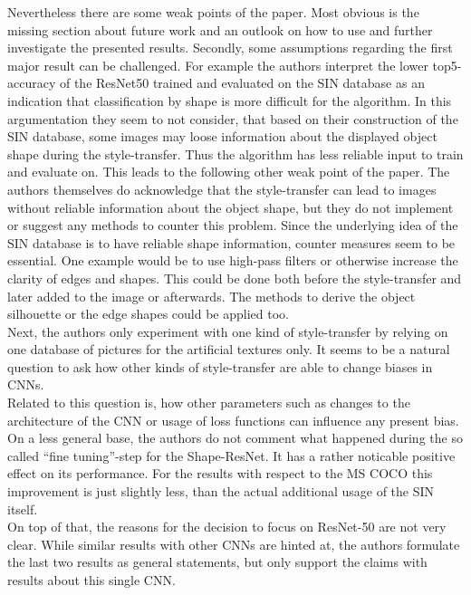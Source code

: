 \documentclass[runningheads,a4paper]{llncs}
\begin{document}
Nevertheless there are some weak points of the paper. Most obvious is the missing section about future work and an outlook on how to use and further investigate the presented results.
Secondly, some assumptions regarding the first major result can be challenged. For example the authors interpret the lower top5-accuracy of the ResNet50 trained and evaluated on the SIN database as an indication that classification by shape is more difficult for the algorithm. In this argumentation they seem to not consider, that based on their construction of the SIN database, some images may loose information about the displayed object shape during the style-transfer. Thus the algorithm has less reliable input to train and evaluate on. This leads to the following other weak point of the paper. The authors themselves do acknowledge that the style-transfer can lead to images without reliable information about the object shape, but they do not implement or suggest any methods to counter this problem. Since the underlying idea of the SIN database is to have reliable shape information, counter measures seem to be essential. One example would be to use high-pass filters or otherwise increase the clarity of edges and shapes. This could be done both before the style-transfer and later added to the image or afterwards. The methods to derive the object silhouette or the edge shapes could be applied too.\\
Next, the authors only experiment with one kind of style-transfer by relying on one database of pictures for the artificial textures only. It seems to be a natural question to ask how other kinds of style-transfer are able to change biases in CNNs.\\
Related to this question is, how other parameters such as changes to the architecture of the CNN or usage of loss functions can influence any present bias.\\

On a less general base, the authors do not comment what happened during the so called ``fine tuning''-step for the Shape-ResNet. It has a rather noticable positive effect on its performance. For the results with respect to the MS COCO this improvement is just slightly less, than the actual additional usage of the SIN itself.\\
On top of that, the reasons for the decision to focus on ResNet-50 are not very clear. While similar results with other CNNs are hinted at, the authors formulate the last two results as general statements, but only support the claims with results about this single CNN.\\
\end{document}
